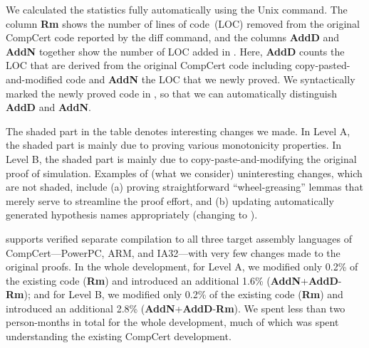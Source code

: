 We calculated the statistics fully automatically using the Unix
 command. The column \textbf{Rm} shows the number of
lines of code~(LOC) removed from the original CompCert code reported
by the diff command, and the columns \textbf{AddD} and \textbf{AddN}
together show the number of LOC added in \sepcomp.  Here,
\textbf{AddD} counts the LOC that are derived from the original
CompCert code including copy-pasted-and-modified code and \textbf{AddN}
the LOC that we newly proved. We syntactically marked the newly proved
code in \sepcomp, so that we can automatically distinguish
\textbf{AddD} and \textbf{AddN}.

The shaded part in the table denotes interesting changes we made.  In
Level A, the shaded part is mainly due to proving various monotonicity
properties. In Level B, the shaded part is mainly due to
copy-paste-and-modifying the original proof of simulation.  Examples of
(what we consider) uninteresting changes, which are not shaded,
include (a) proving straightforward ``wheel-greasing'' lemmas that
merely serve to streamline the proof effort, and (b) updating
automatically generated hypothesis names appropriately (\eg changing
 to ).

\sepcomp{} supports verified separate compilation to all three target
assembly languages of CompCert---PowerPC, ARM, and IA32---with very
few changes made to the original proofs. In the whole development, for
Level A, we modified only 0.2\% of the existing code (\textbf{Rm}) and
introduced an additional 1.6\%
(\textbf{AddN}+\textbf{AddD}-\textbf{Rm}); and for Level B, we
modified only 0.2\% of the existing code (\textbf{Rm}) and introduced
an additional 2.8\% (\textbf{AddN}+\textbf{AddD}-\textbf{Rm}).  We
spent less than two person-months in total for the whole development,
much of which was spent understanding the existing CompCert
development.



